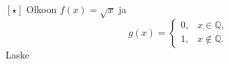 \begin{tehtavasivu}
\begin{tehtava}
\begin{alakohdat}
		\end{alakohdat}
  \begin{vastaus}
\begin{alakohdat}
\end{alakohdat}
  \end{vastaus}
\end{tehtava}

\begin{tehtava}$\boldsymbol{[\star]}$ %
	Olkoon $f(x) =\sqrt{x} $ 
	ja 
	\begin{equation*}
	g(x)=
		\begin{cases}
		  0, & x \in \mathbb{Q},\\
		  1, & x \notin \mathbb{Q}.
		\end{cases}
	\end{equation*}
	Laske
	\begin{alakohdat}
	\end{alakohdat}
	
    \begin{vastaus}
	\begin{alakohdat}
		\alakohta{$1$}
		\alakohta{$0$}
	\end{alakohdat}
    \end{vastaus}

	
	
\end{tehtava}



\end{tehtavasivu}
